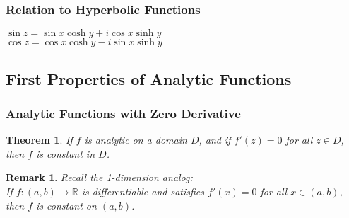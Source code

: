 \documentclass{article}
\newtheorem{theorem}{Theorem}[section]
\newtheorem*{remark}{Remark}
\begin{document}
\subsubsection{Relation to Hyperbolic Functions}
$\sin z = \sin x \cosh y + i \cos x \sinh y$ \\
$\cos z = \cos x \cosh y - i \sin x \sinh y$

\subsection{First Properties of Analytic Functions}

\subsubsection{Analytic Functions with Zero Derivative}
\begin{theorem}
If $f$ is analytic on a domain $D$, and if $f'(z) = 0$ for all $z\in D$, then $f$ is constant in $D$.
\end{theorem}
\begin{remark}
Recall the 1-dimension analog: \\
If $f : (a, b) \to \mathbb{R}$ is differentiable and satisfies $f'(x) = 0$ for all $x \in (a, b)$, then $f$ is constant on $(a, b)$.
\end{remark}
\end{document}
